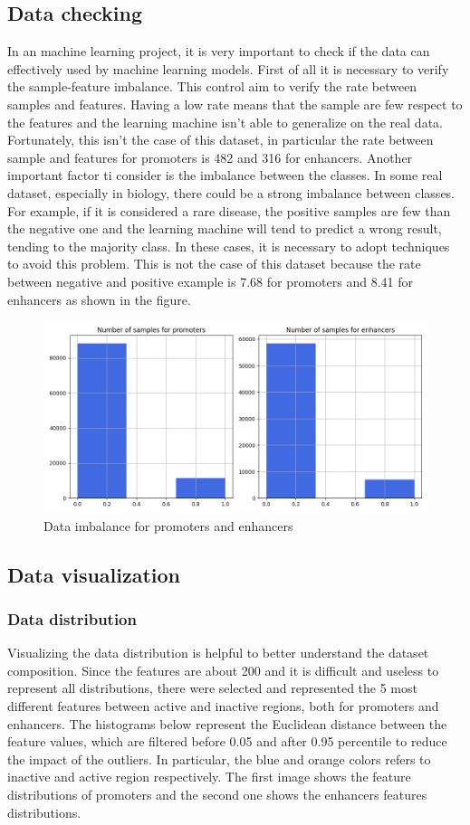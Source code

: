 \subsection{Data checking}

In an machine learning project, it is very important to check if the
data can effectively used by machine learning models. First of all it is
necessary to verify the sample-feature imbalance. This control aim to
verify the rate between samples and features. Having a low rate means
that the sample are few respect to the features and the learning machine
isn't able to generalize on the real data. Fortunately, this isn't the
case of this dataset, in particular the rate between sample and features
for promoters is 482 and 316 for enhancers. Another important factor ti
consider is the imbalance between the classes. In some real dataset,
especially in biology, there could be a strong imbalance between
classes. For example, if it is considered a rare disease, the positive
samples are few than the negative one and the learning machine will tend
to predict a wrong result, tending to the majority class. In these
cases, it is necessary to adopt techniques to avoid this problem. This
is not the case of this dataset because the rate between negative and
positive example is 7.68 for promoters and 8.41 for enhancers as shown
in the figure.

\begin{figure}[b]
\centering
\includegraphics[width=0.6\linewidth]{../images/plot_class_imbalance.png}
\caption{Data imbalance for promoters and enhancers}
\end{figure}

\subsection{Data visualization}

\subsubsection{Data distribution}
Visualizing the data distribution is helpful to better understand the
dataset composition. Since the features are about 200 and it is
difficult and useless to represent all distributions, there were
selected and represented the 5 most different features between active
and inactive regions, both for promoters and enhancers. The histograms
below represent the Euclidean distance between the feature values, which
are filtered before 0.05 and after 0.95 percentile to reduce the impact
of the outliers. In particular, the blue and orange colors refers to
inactive and active region respectively. The first image shows the
feature distributions of promoters and the second one shows the
enhancers features distributions.

